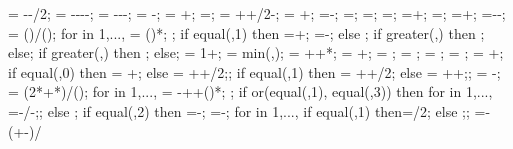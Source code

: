 {{\isotopy = -\supportheight-\baselinet/2;
\foundboty = -\supportheight-\baselinet-\isolationdepth-\foundationdepth;
\foundtopy = -\supportheight-\baselinet-\isolationdepth;
\foundstartx = -\foundsidew;
\foundendx = \x{\columnnumber}+\foundsidew;
\structheight=\storynumber*\storyheight;
\isomidy = \supportheight+\isolinet+\isolationdepth/2-\baselinet;
\soilbelowfoundtof = \soilbelowfound+\supportheight;
\basewallstartx=-\supportwidth;
\buildingwidth=\baynumber*\baywidth;
\basewalldepth=\subfloors*\storyheight;
\basewallstarty=\basewalldepth;
\basewallendx=\buildingwidth+\supportwidth;
\basewallendy=\basewallstarty;
\rightsoilx=\buildingwidth+\rightsoildist;
\rightsoily=\basewalldepth-\rightsoildepth-\supportheight;
\isospace = (\buildingwidth)/();
for \kiso in {1,...,{\numberofisolators}}{
\xiso{\kiso} = ()*\isospace;
};
if equal(\isoshiftyn,1) then
{=+\isoshift;
\xiso{\numberofisolators}=\xiso{\numberofisolators}-\isoshift;}
else {};
if greater(\doflocfloor,\storynumber) then {;} else{};
if greater(\dofloccolumn,\columnnumber) then {;} else{};
\dofloch = 1+\doflocfloor;
\minlen = min(\storyheight,\baywidth);
\dofxx = \x{\dofloccolumn}+\dofoffsetratio*\minlen+*\showdefl;
\dofyy = \y{\dofloch}+\dofoffsetratio*\minlen;
\arrlen = \arrowlenratio*\minlen;
\arrrad = \rotarrowlenratio*\minlen;
\Xaxesstarty = ;
\Yaxesstartx = ;
\Yaxesstarty = \y{\levelnumber}+\axisseperation;
if equal(\showsupports,0) then
{\Xaxesstartx = \x{\columnnumber}+\axisseperation;} else
{\Xaxesstartx = \x{\columnnumber}+\axisseperation+\supportwidth/2;};
if equal(\showsupports,1) then
{\Xaxesstartx = \x{\columnnumber}+\axisseperation+\supportwidth/2;} else
{\Xaxesstartx = \x{\columnnumber}+\axisseperation+\supportwidth;};
\pilecoordy = -\supportheight;
\pilespace = 
(2*\supportwidth+*\pilesidespace)/();
for \pileind in {1,...,{\numberofpiles}}{
\pilecoordx{\pileind} = -\supportwidth+\pilesidespace+()*\pilespace;
};
if or(equal(\latloadtype,1), equal(\latloadtype,3)) then {
for \iarr in {1,...,{\levelnumber}}{
	\arrstartx{\iarr}=-\toparrlen*\y{\iarr}/\structheight-\latloadshift;};
} else {};
if equal(\latloadtype,2) then {
	=-\latloadshift;
	=-\isomidy;
	for \iarr in {1,...,{\levelnumber}}{
		if equal(\iarr,1) then{\addtempy=\supportheight/2;} else {;};
		\arrstartx{\iarr}=-\toparrlen*(\y{\iarr}+\isomidy-\addtempy)/
}}}}
